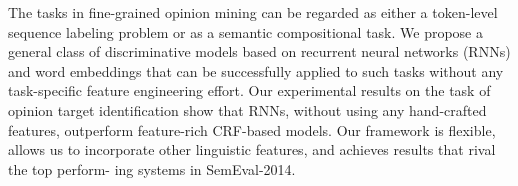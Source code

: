 The tasks in fine-grained opinion mining can be regarded as either a token-level sequence labeling problem or as a semantic compositional task. We propose a general class of discriminative models based on recurrent neural networks (RNNs) and word embeddings that can be successfully applied to such tasks without any task-specific feature engineering effort. Our experimental results on the task of opinion target identification show that RNNs, without using any hand-crafted features, outperform feature-rich CRF-based models. Our framework is flexible, allows us to incorporate other linguistic features, and achieves results that rival the top perform- ing systems in SemEval-2014.
